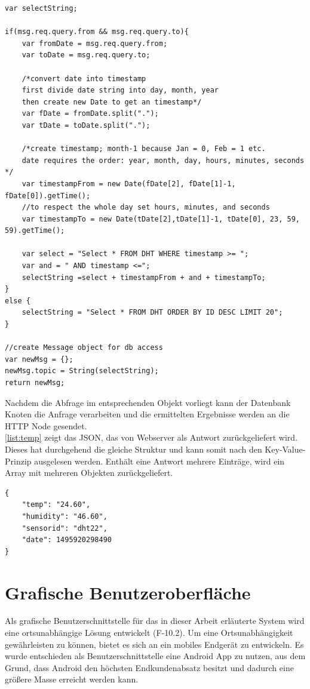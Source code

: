 \begin{lstlisting}[label=list:tempInt, caption={Funktion Node-Red tempInt}]
var selectString;

if(msg.req.query.from && msg.req.query.to){
	var fromDate = msg.req.query.from;
	var toDate = msg.req.query.to;
	
	/*convert date into timestamp
	first divide date string into day, month, year 
	then create new Date to get an timestamp*/
	var fDate = fromDate.split("."); 
	var tDate = toDate.split(".");
	
	/*create timestamp; month-1 because Jan = 0, Feb = 1 etc.
	date requires the order: year, month, day, hours, minutes, seconds */
	var timestampFrom = new Date(fDate[2], fDate[1]-1, fDate[0]).getTime();
	//to respect the whole day set hours, minutes, and seconds
	var timestampTo = new Date(tDate[2],tDate[1]-1, tDate[0], 23, 59, 59).getTime();
	
	var select = "Select * FROM DHT WHERE timestamp >= "; 
	var and = " AND timestamp <=";
	selectString =select + timestampFrom + and + timestampTo;
}
else {
	selectString = "Select * FROM DHT ORDER BY ID DESC LIMIT 20";
}

//create Message object for db access
var newMsg = {};
newMsg.topic = String(selectString);
return newMsg;
\end{lstlisting}

Nachdem die Abfrage im entsprechenden Objekt vorliegt kann der Datenbank Knoten die Anfrage verarbeiten und die ermittelten Ergebnisse werden an die \ac{HTTP} Node gesendet.
\\\autoref{list:temp}  zeigt das \ac{JSON}, das von Webserver als Antwort zurückgeliefert wird. Dieses hat durchgehend die gleiche Struktur und kann somit nach den Key-Value-Prinzip ausgelesen werden. Enthält eine Antwort mehrere Einträge, wird ein Array mit mehreren Objekten zurückgeliefert.
\begin{lstlisting}[label=list:temp, caption={JSON Response /temp}]
{
	"temp": "24.60",
	"humidity": "46.60",
	"sensorid": "dht22",
	"date": 1495920298490
}
\end{lstlisting}


\section{Grafische Benutzeroberfläche} %
Als grafische Benutzerschnittstelle für das in dieser Arbeit erläuterte System wird eine ortsunabhängige Lösung entwickelt (F-10.2). Um eine Ortsunabhängigkeit gewährleisten zu können, bietet es sich an ein mobiles Endgerät zu entwickeln. Es wurde  entschieden als Benutzerschnittstelle eine Android App zu nutzen, aus dem Grund, dass Android den höchsten Endkundenabsatz besitzt \cite{statista:marktanteileandroid} und dadurch eine größere Masse erreicht werden kann.
